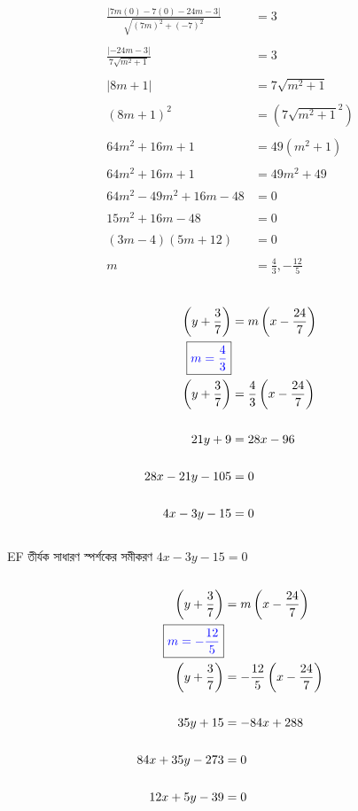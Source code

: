 \documentclass{article}
\begin{document}
	\\  
	\begin{align*}
		\frac{|7m(0)-7(0)-24m-3|}{\sqrt{(7m)^2+(-7)^2}}&=3\\
		\\
		\frac{|-24m-3|}{7\sqrt{m^2+1}}&=3\\
		\\
		|8m+1|&=7\sqrt{m^2+1}\\
		\\
		(8m+1)^2&=(7\sqrt{m^2+1}^2)\\
		\\
		64m^2+16m+1&=49(m^2+1)\\
		\\
		64m^2+16m+1&=49m^2+49\\
		\\
		64m^2-49m^2+16m-48&=0\\
		\\
		15m^2+16m-48&=0\\
		\\
		(3m-4)(5m+12)&=0\\
		\\
		m&=\frac{4}{3},-\frac{12}{5}\\
	\end{align*}
	\\
	\begin{align*}
		\left(y+\frac{3}{7}\right)&=m\left(x-\frac{24}{7}\right)\\
		\boxed{\textcolor{blue}{m=\frac{4}{3}}}&\\
		\left(y+\frac{3}{7}\right)&=\frac{4}{3}\left(x-\frac{24}{7}\right)\\
		\\
		21y+9&=28x-96\\
		\\
		28x-21y-105&=0\\
		\\
		4x-3y-15&=0\\
	\end{align*}
	\\
	EF তীর্যক সাধারণ স্পর্শকের সমীকরণ  $4x-3y-15=0$\\
	\\ 
	\begin{align*}
		\left(y+\frac{3}{7}\right)&=m\left(x-\frac{24}{7}\right)\\
		\boxed{\textcolor{blue}{m=-\frac{12}{5}}}&\\
		\left(y+\frac{3}{7}\right)&=-\frac{12}{5}\left(x-\frac{24}{7}\right)\\
		\\
		35y+15&=-84x+288\\
		\\
		84x+35y-273&=0\\
		\\
		12x+5y-39&=0\\
	\end{align*}
\end{document}

